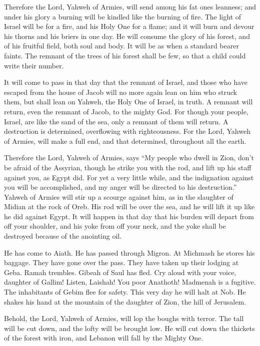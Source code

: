 {Therefore the Lord, Yahweh of Armies, will send among his fat ones leanness; and under his glory a burning will be kindled like the burning of fire.
The light of Israel will be for a fire, and his Holy One for a flame; and it will burn and devour his thorns and his briers in one day.
He will consume the glory of his forest, and of his fruitful field, both soul and body. It will be as when a standard bearer faints.
The remnant of the trees of his forest shall be few, so that a child could write their number.
\par }{\PP {}It will come to pass in that day that the remnant of Israel, and those who have escaped from the house of Jacob will no more again lean on him who struck them, but shall lean on Yahweh, the Holy One of Israel, in truth.
A remnant will return, even the remnant of Jacob, to the mighty God.
For though your people, Israel, are like the sand of the sea, only a remnant of them will return. A destruction is determined, overflowing with righteousness.
For the Lord, Yahweh of Armies, will make a full end, and that determined, throughout all the earth.
\par }{\PP {}Therefore the Lord, Yahweh of Armies, says “My people who dwell in Zion, don’t be afraid of the Assyrian, though he strike you with the rod, and lift up his staff against you, as Egypt did.
For yet a very little while, and the indignation against you will be accomplished, and my anger will be directed to his destruction.”
Yahweh of Armies will stir up a scourge against him, as in the slaughter of Midian at the rock of Oreb. His rod will be over the sea, and he will lift it up like he did against Egypt.
It will happen in that day that his burden will depart from off your shoulder, and his yoke from off your neck, and the yoke shall be destroyed because of the anointing oil.
\par }{\PP {}He has come to Aiath. He has passed through Migron. At Michmash he stores his baggage.
They have gone over the pass. They have taken up their lodging at Geba. Ramah trembles. Gibeah of Saul has fled.
Cry aloud with your voice, daughter of Gallim! Listen, Laishah! You poor Anathoth!
Madmenah is a fugitive. The inhabitants of Gebim flee for safety.
This very day he will halt at Nob. He shakes his hand at the mountain of the daughter of Zion, the hill of Jerusalem.
\par }{\PP {}Behold, the Lord, Yahweh of Armies, will lop the boughs with terror. The tall will be cut down, and the lofty will be brought low.
He will cut down the thickets of the forest with iron, and Lebanon will fall by the Mighty One.

}
